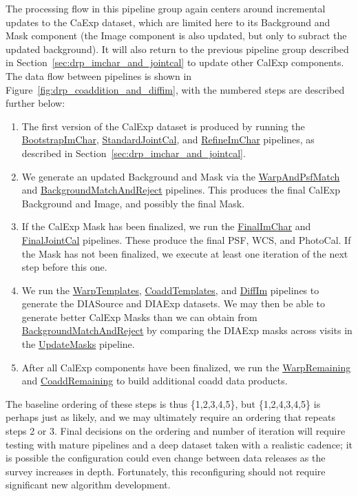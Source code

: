 The processing flow in this pipeline group again centers around incremental updates to the CaExp dataset, which are limited here to its Background and Mask component (the Image component is also updated, but only to subract the updated background).  It will also return to the previous pipeline group described in Section~\ref{sec:drp_imchar_and_jointcal} to update other CalExp components.  The data flow between pipelines is shown in Figure~\ref{fig:drp_coaddition_and_diffim}, with the numbered steps are described further below:
\begin{enumerate} %
\item The first version of the CalExp dataset is produced by running the \hyperref[sec:drpBootstrapImChar]{BootstrapImChar}, \hyperref[sec:drpStandardJointCal]{StandardJointCal}, and \hyperref[sec:drpRefineImChar]{RefineImChar} pipelines, as described in Section~\ref{sec:drp_imchar_and_jointcal}.
\item We generate an updated Background and Mask via the \hyperref[sec:drpWarpAndPsfMatch]{WarpAndPsfMatch} and \hyperref[sec:drpBackgroundMatchAndReject]{BackgroundMatchAndReject} pipelines.  This produces the final CalExp Background and Image, and possibly the final Mask.
\item If the CalExp Mask has been finalized, we run the \hyperref[sec:drpFinalImChar]{FinalImChar} and \hyperref[sec:drpFinalJointCal]{FinalJointCal} pipelines.  These produce the final PSF, WCS, and PhotoCal.  If the Mask has not been finalized, we execute at least one iteration of the next step before this one.
\item We run the \hyperref[sec:drpWarpTemplates]{WarpTemplates}, \hyperref[sec:drpCoaddTemplates]{CoaddTemplates}, and \hyperref[sec:drpDiffIm]{DiffIm} pipelines to generate the DIASource and DIAExp datasets.  We may then be able to generate better CalExp Masks than we can obtain from \hyperref[sec:drpBackgroundMatchAndReject]{BackgroundMatchAndReject} by comparing the DIAExp masks across visits in the \hyperref[sec:drpUpdateMasks]{UpdateMasks} pipeline.
\item After all CalExp components have been finalized, we run the \hyperref[sec:drpWarpRemaining]{WarpRemaining} and \hyperref[sec:drpCoaddRemaining]{CoaddRemaining} to build additional coadd data products.
\end{enumerate}
The baseline ordering of these steps is thus \{1,2,3,4,5\}, but \{1,2,4,3,4,5\} is perhaps just as likely, and we may ultimately require an ordering that repeats steps 2 or 3.  Final decisions on the ordering and number of iteration will require testing with mature pipelines and a deep dataset taken with a realistic cadence; it is possible the configuration could even change between data releases as the survey increases in depth.  Fortunately, this reconfiguring should not require significant new algorithm development.


